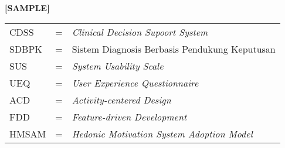 \begin{center}
	\textbf{[SAMPLE]}
\end{center}

\begin{tabular}{llp{3in}}
	CDSS &  \hspace{1.5cm} = &	\textit{Clinical Decision Supoort System}\\
	SDBPK &  \hspace{1.5cm} = &	Sistem Diagnosis Berbasis Pendukung Keputusan\\
	SUS	& \hspace{1.5cm} = & \textit{System Usability Scale} \\
	UEQ & \hspace{1.5cm} = & \textit{User Experience Questionnaire }\\ 
	ACD & \hspace{1.5cm} = & \textit{Activity-centered Design} \\
	FDD & \hspace{1.5cm} = & \textit{Feature-driven Development} \\
	HMSAM & \hspace{1.5cm} = & \textit{Hedonic Motivation System Adoption Model } \\
\end{tabular}
